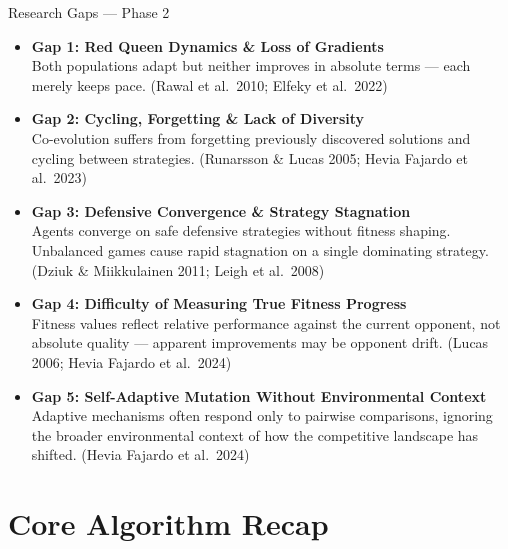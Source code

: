 \documentclass[aspectratio=169, 10pt]{beamer}
\begin{document}
\begin{frame}{Research Gaps --- Phase 2}
\scriptsize
\begin{itemize}
    \item \textbf{\textcolor{amritaMaroon}{Gap 1: Red Queen Dynamics \& Loss of Gradients}}\\
    Both populations adapt but neither improves in absolute terms --- each merely keeps pace. (Rawal et al.\ 2010; Elfeky et al.\ 2022)
    \vspace{0.15cm}
    
    \item \textbf{\textcolor{amritaMaroon}{Gap 2: Cycling, Forgetting \& Lack of Diversity}}\\
    Co-evolution suffers from forgetting previously discovered solutions and cycling between strategies. (Runarsson \& Lucas 2005; Hevia Fajardo et al.\ 2023)
    \vspace{0.15cm}
    
    \item \textbf{\textcolor{amritaMaroon}{Gap 3: Defensive Convergence \& Strategy Stagnation}}\\
    Agents converge on safe defensive strategies without fitness shaping. Unbalanced games cause rapid stagnation on a single dominating strategy. (Dziuk \& Miikkulainen 2011; Leigh et al.\ 2008)
    \vspace{0.15cm}
    
    \item \textbf{\textcolor{amritaMaroon}{Gap 4: Difficulty of Measuring True Fitness Progress}}\\
    Fitness values reflect relative performance against the current opponent, not absolute quality --- apparent improvements may be opponent drift. (Lucas 2006; Hevia Fajardo et al.\ 2024)
    \vspace{0.15cm}
    
    \item \textbf{\textcolor{amritaMaroon}{Gap 5: Self-Adaptive Mutation Without Environmental Context}}\\
    Adaptive mechanisms often respond only to pairwise comparisons, ignoring the broader environmental context of how the competitive landscape has shifted. (Hevia Fajardo et al.\ 2024)
\end{itemize}
\end{frame}

\section{Core Algorithm Recap}
\end{document}
